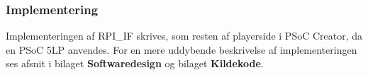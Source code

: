 \documentclass[Rapport/Playerside/RPI_IF/RPI_IF.tex]{subfiles}
\begin{document}
\subsubsection{Implementering}
Implementeringen af RPI\_IF skrives, som resten af playerside i PSoC Creator, da en PSoC 5LP anvendes. For en mere uddybende beskrivelse af implementeringen ses afsnit  i bilaget \textbf{Softwaredesign} og bilaget \textbf{Kildekode}. 
\end{document}
